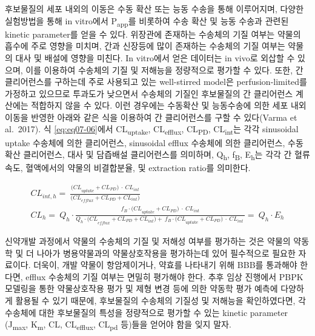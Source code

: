 \documentclass[
  11pt,
  krantz2, a4paper, twoside]{krantz}
\begin{document}
후보물질의 세포 내외의 이동은 수동 확산 또는 능동 수송을 통해
이루어지며, 다양한 실험방법을 통해 in vitro에서 P\textsubscript{app}를 비롯하여 수송
확산 및 능동 수송과 관련된 kinetic parameter를 얻을 수 있다. 위장관에
존재하는 수송체의 기질 여부는 약물의 흡수에 주로 영향을 미치며, 간과
신장등에 많이 존재하는 수송체의 기질 여부는 약물의 대사 및 배설에 영향을
미친다. In vitro에서 얻은 데이터는 in vivo로 외삽할 수 있으며, 이를
이용하여 수송체의 기질 및 저해능을 정량적으로 평가할 수 있다. 또한, 간
클리어런스를 구하는데 주로 사용되고 있는 well-stirred model은
perfusion-limited를 가정하고 있으므로 투과도가 낮으면서 수송체의 기질인
후보물질의 간 클리어런스 계산에는 적합하지 않을 수 있다. 이런 경우에는
수동확산 및 능동수송에 의한 세포 내외 이동을 반영한 아래와 같은 식을
이용하여 간 클리어런스를 구할 수 있다(Varma et al.~2017). 식 \eqref{eq:eq07-06}에서
CL\textsubscript{uptake}, CL\textsubscript{efflux}, CL\textsubscript{PD}, CL\textsubscript{int}는 각각 sinusoidal uptake
수송체에 의한 클리어런스, sinusoidal efflux 수송체에 의한 클리어런스,
수동확산 클리어런스, 대사 및 담즙배설 클리어런스를 의미하며, Q\textsubscript{h}, f\textsubscript{B},
E\textsubscript{h}는 각각 간 혈류 속도, 혈액에서의 약물의 비결합분율, 및 extraction
ratio를 의미한다.

\begin{equation}
\begin{split}
{CL}_{int,h} = \ \frac{{(CL}_{uptake} + {CL}_{PD})\  \cdot \ {CL}_{int}}{{(CL}_{efflux} + {CL}_{PD} + {CL}_{int})} \\
{CL}_{h} = \ Q_{h} \cdot \frac{f_{B} \cdot {(CL}_{uptake} + {CL}_{PD})\  \cdot \ {CL}_{int}}{{Q_{h} \cdot (CL}_{efflux} + {CL}_{PD} + {CL}_{int}) + \ f_{B} \cdot {(CL}_{uptake} + {CL}_{PD})\  \cdot \ {CL}_{int}\ } = \ Q_{h} \cdot E_{h}
\end{split}
\label{eq:eq07-06} 
\end{equation}

신약개발 과정에서 약물의 수송체의 기질 및 저해성 여부를 평가하는 것은
약물의 약동학 및 더 나아가 병용약물과의 약물상호작용을 평가하는데 있어
필수적으로 필요한 자료이다. 더욱이, 개발 약물이 항암제이거나, 약효를
나타내기 위해 BBB를 통과해야 한다면, efflux 수송체의 기질 여부는 면밀히
평가해야 한다. 추후 임상 진행에서 PBPK 모델링을 통한 약물상호작용 평가
및 제형 변경 등에 의한 약동학 평가 예측에 다양하게 활용될 수 있기
때문에, 후보물질의 수송체의 기질성 및 저해능을 확인하였다면, 각 수송체에
대한 후보물질의 특성을 정량적으로 평가할 수 있는 kinetic parameter
(J\textsubscript{max}, K\textsubscript{m}, CL, CL\textsubscript{efflux}, CL\textsubscript{pd} 등)들을 얻어야 함을 잊지 말자.
\end{document}
